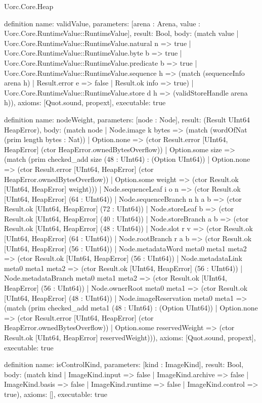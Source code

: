 \begin{lexlean}{Uorc.Core.Heap}
\begin{semanticmodule}
definition{
  name: validValue,
  parameters: [arena : Arena, value : Uorc.Core.RuntimeValue::RuntimeValue],
  result: Bool,
  body: (match value
    | Uorc.Core.RuntimeValue::RuntimeValue.natural n => true
    | Uorc.Core.RuntimeValue::RuntimeValue.byte b => true
    | Uorc.Core.RuntimeValue::RuntimeValue.predicate b => true
    | Uorc.Core.RuntimeValue::RuntimeValue.sequence h => (match (sequenceInfo arena h)
      | Result.error e => false
      | Result.ok info => true)
    | Uorc.Core.RuntimeValue::RuntimeValue.store d h => (validStoreHandle arena h)),
  axioms: [Quot.sound, propext],
  executable: true
}

definition{
  name: nodeWeight,
  parameters: [node : Node],
  result: (Result UInt64 HeapError),
  body: (match node
    | Node.image k bytes => (match (wordOfNat (prim length bytes : Nat))
      | Option.none => (ctor Result.error [UInt64, HeapError] (ctor HeapError.ownedBytesOverflow))
      | Option.some size => (match (prim checked_add size (48 : UInt64) : (Option UInt64))
        | Option.none => (ctor Result.error [UInt64, HeapError] (ctor HeapError.ownedBytesOverflow))
        | Option.some weight => (ctor Result.ok [UInt64, HeapError] weight)))
    | Node.sequenceLeaf i o n => (ctor Result.ok [UInt64, HeapError] (64 : UInt64))
    | Node.sequenceBranch n h a b => (ctor Result.ok [UInt64, HeapError] (72 : UInt64))
    | Node.storeLeaf b => (ctor Result.ok [UInt64, HeapError] (40 : UInt64))
    | Node.storeBranch a b => (ctor Result.ok [UInt64, HeapError] (48 : UInt64))
    | Node.slot r v => (ctor Result.ok [UInt64, HeapError] (64 : UInt64))
    | Node.rootBranch r a b => (ctor Result.ok [UInt64, HeapError] (56 : UInt64))
    | Node.metadataWord meta0 meta1 meta2 => (ctor Result.ok [UInt64, HeapError] (56 : UInt64))
    | Node.metadataLink meta0 meta1 meta2 => (ctor Result.ok [UInt64, HeapError] (56 : UInt64))
    | Node.metadataBranch meta0 meta1 meta2 => (ctor Result.ok [UInt64, HeapError] (56 : UInt64))
    | Node.ownerRoot meta0 meta1 => (ctor Result.ok [UInt64, HeapError] (48 : UInt64))
    | Node.imageReservation meta0 meta1 => (match (prim checked_add meta1 (48 : UInt64) : (Option UInt64))
      | Option.none => (ctor Result.error [UInt64, HeapError] (ctor HeapError.ownedBytesOverflow))
      | Option.some reservedWeight => (ctor Result.ok [UInt64, HeapError] reservedWeight))),
  axioms: [Quot.sound, propext],
  executable: true
}

definition{
  name: isControlKind,
  parameters: [kind : ImageKind],
  result: Bool,
  body: (match kind
    | ImageKind.input => false
    | ImageKind.archive => false
    | ImageKind.basis => false
    | ImageKind.runtime => false
    | ImageKind.control => true),
  axioms: [],
  executable: true
}


\end{semanticmodule}
\end{lexlean}
